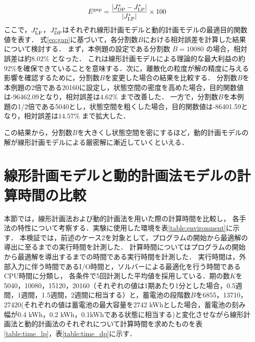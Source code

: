 \begin{equation}
E^{\rm gap} = \frac{| J_{\rm DP}^*- J_{\rm LP}^* |}{| J_{\rm LP}^* |} \times 100
\label{eq:gap}
\end{equation}
ここで，$J_{\rm LP}^* $，$J_{\rm DP}^*$はそれぞれ線形計画モデルと動的計画モデルの最適目的関数値を表す．
式\eqref{eq:gap}に基づいて，各分割数$B$における相対誤差を計算した結果について検討する．
まず，本例題の設定である分割数 $B=10080$ の場合，相対誤差は約$8.02 \%$ となった．
これは線形計画モデルによる理論的な最大利益の約92\%を確保できていることを意味する．次に，離散化の粒度が解の精度に与える影響を確認するために，分割数$B$を変更した場合の結果を比較する．
分割数$B$を本例題の2倍である20160に設定し，状態空間の密度を高めた場合，目的関数値は-96462.09となり，相対誤差は$4.62 \%$ まで改善した．
一方で，分割数$B$を本例題の1/2倍である5040とし，状態空間を粗くした場合，目的関数値は-86401.59となり，相対誤差は$14.57 \%$ まで拡大した．

この結果から，分割数$B$を大きくし状態空間を密にするほど，動的計画モデルの解が線形計画モデルによる厳密解に漸近していくといえる．

\section{線形計画モデルと動的計画法モデルの計算時間の比較}
本節では，線形計画法および動的計画法を用いた際の計算時間を比較し，
各手法の特性について考察する．実験に使用した環境を表\ref{table:environment}に示す．
本検証では，前述のケース2を対象として，プログラムの開始から最適解の導出に至るまでの実行時間を計測した．
計算時間についてはプログラムの開始から最適解を導出するまでの時間である実行時間を計測した．
実行時間は，外部入力に伴う時間であるI/O時間と，ソルバーによる最適化を行う時間であるCPU時間に分類し，
各条件で5回計測した平均値を採用している．期の数$K$を5040，10080，15120，20160（それぞれの値は1期あたり1分とした場合，0.5週間，1週間，1.5週間，2週間に相当する）と，蓄電池の段階数$B$を6855，13710，27420(それぞれの値は蓄電池の最大容量を2742 kWhとした場合，蓄電池の刻み幅が0.4 kWh，0.2 kWh，0.1kWhである状態に相当する)と変化させながら線形計画法と動的計画法のそれぞれについて計算時間を求めたものを表\ref{table:time_lp}，表\ref{table:time_dp}に示す．

